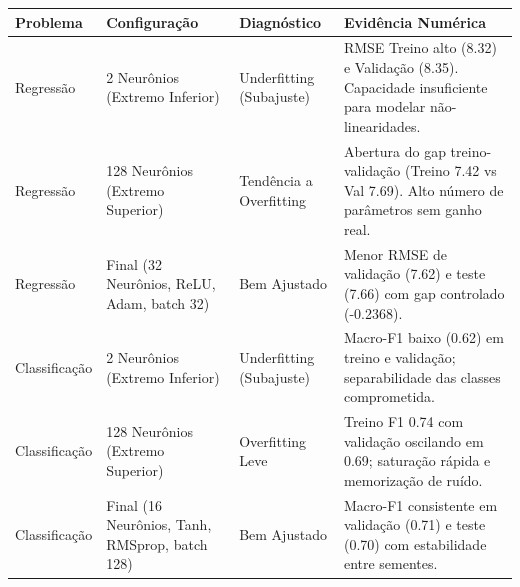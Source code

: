 \begin{tabular}{llll}
\toprule
Problema & Configuração & Diagnóstico & Evidência Numérica \\
\midrule
Regressão & 2 Neurônios (Extremo Inferior) & Underfitting (Subajuste) & RMSE Treino alto (8.32) e Validação (8.35). Capacidade insuficiente para modelar não-linearidades. \\
Regressão & 128 Neurônios (Extremo Superior) & Tendência a Overfitting & Abertura do gap treino-validação (Treino 7.42 vs Val 7.69). Alto número de parâmetros sem ganho real. \\
Regressão & Final (32 Neurônios, ReLU, Adam, batch 32) & Bem Ajustado & Menor RMSE de validação (7.62) e teste (7.66) com gap controlado (-0.2368). \\
Classificação & 2 Neurônios (Extremo Inferior) & Underfitting (Subajuste) & Macro-F1 baixo (0.62) em treino e validação; separabilidade das classes comprometida. \\
Classificação & 128 Neurônios (Extremo Superior) & Overfitting Leve & Treino F1 0.74 com validação oscilando em 0.69; saturação rápida e memorização de ruído. \\
Classificação & Final (16 Neurônios, Tanh, RMSprop, batch 128) & Bem Ajustado & Macro-F1 consistente em validação (0.71) e teste (0.70) com estabilidade entre sementes. \\
\bottomrule
\end{tabular}

